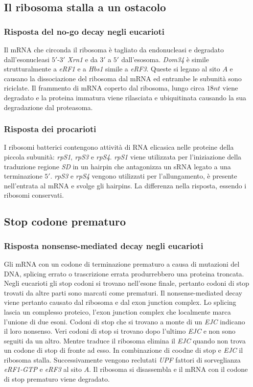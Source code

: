 \subsection{Il ribosoma stalla a un ostacolo}
\subsubsection{Risposta del no-go decay negli eucarioti}
Il mRNA che circonda il ribosoma \`e tagliato da endonucleasi e degradato dall'esonucleasi $5'$-$3'$ \emph{Xrn1} e da $3'$ a $5'$ dall'esosoma. \emph{Dom34} \`e
simile strutturalmente a \emph{eRF1} e a \emph{Hbs1} simile a \emph{eRF3}. Queste si legano al sito $A$ e causano la dissociazione del ribosoma dal mRNA ed entrambe le subunit\`a 
sono riciclate. Il frammento di mRNA coperto dal ribosoma, lungo circa $18nt$ viene degradato e la proteina immatura viene rilasciata e ubiquitinata causando la sua degradazione dal
proteasoma. 
\subsubsection{Risposta dei procarioti}
I ribosomi batterici contengono attivit\`a di RNA elicasica nelle proteine della piccola subunit\`a: \emph{rpS1}, \emph{rpS3} e \emph{rpS4}. \emph{rpS1} viene utilizzata per l'iniziazione
della traduzione regione \emph{SD} in un hairpin che antagonizza un sRNA legato a una terminazione $5'$. \emph{rpS3} e \emph{rpS4} vengono utilizzati per l'allungamento, \`e presente
nell'entrata al mRNA e svolge gli hairpins. La differenza nella risposta, essendo i ribosomi conservati.
\subsection{Stop codone prematuro}
\subsubsection{Risposta nonsense-mediated decay negli eucarioti}
Gli mRNA con un codone di terminazione prematuro a causa di mutazioni del DNA, splicing errato o trascrizione errata produrrebbero una proteina troncata. Negli eucarioti gli 
stop codoni si trovano nell'esone finale, pertanto codoni di stop trovati da altre parti sono marcati come prematuri. Il nonsense-mediated decay viene pertanto causato dal ribosoma
e dal exon junction complex. Lo splicing lascia un complesso proteico, l'exon junction complex che localmente marca l'unione di due esoni. Codoni di stop che si trovano a monte di un 
\emph{EJC} indicano il loro nonsenso. Veri codoni di stop si trovano dopo l'ultimo \emph{EJC} e non sono seguiti da un altro. Mentre traduce il ribosoma elimina il \emph{EJC} quando non 
trova un codone di stop di fronte ad esso. In combinazione di coodne di stop e \emph{EJC} il ribosoma stalla. Successivamente vengono reclutati \emph{UPF} fattori di sorveglianza 
\emph{eRF1-GTP} e \emph{eRF3} al sito $A$. Il ribosoma si disassembla e il mRNA con il codone di stop prematuro viene degradato. 
